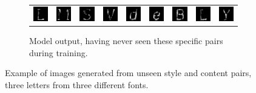 {\begin{figure}
	\begin{subfigure}[t]{\textwidth}
		\begin{tabu} to \textwidth {XXXXXXXXX}
			\includegraphics[scale=1]{tensors/sandc/valid/synth/Georgia-76} &
			\includegraphics[scale=1]{tensors/sandc/valid/synth/Georgia-77} &
			\includegraphics[scale=1]{tensors/sandc/valid/synth/Georgia-83} &
			\includegraphics[scale=1]{tensors/sandc/valid/synth/VeraMoIt-86} &
			\includegraphics[scale=1]{tensors/sandc/valid/synth/VeraMoIt-100} &
			\includegraphics[scale=1]{tensors/sandc/valid/synth/VeraMoIt-101} &
			\includegraphics[scale=1]{tensors/sandc/valid/synth/VeraMono-66} &
			\includegraphics[scale=1]{tensors/sandc/valid/synth/VeraMono-76} &
			\includegraphics[scale=1]{tensors/sandc/valid/synth/VeraMono-89} 
		\end{tabu}
		\caption{Model output, having never seen these specific pairs during training.}
	\end{subfigure}
\caption{Example of images generated from unseen style and content pairs, three letters from
		 three different fonts.}
\label{fig:sandc-valid}
\end{figure}


}
